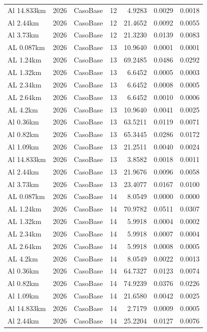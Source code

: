 \documentclass[11pt,a4paper]{article}
\begin{document}
\begin{longtable}{llllrrr}
Al 14.833km & 2026 & CasoBase & 12 & 4.9283 & 0.0029 & 0.0018 \\
Al 2.44km & 2026 & CasoBase & 12 & 21.4652 & 0.0092 & 0.0055 \\
Al 3.73km & 2026 & CasoBase & 12 & 21.3230 & 0.0139 & 0.0083 \\
AL 0.087km & 2026 & CasoBase & 13 & 10.9640 & 0.0001 & 0.0001 \\
AL 1.24km & 2026 & CasoBase & 13 & 69.2485 & 0.0486 & 0.0292 \\
AL 1.32km & 2026 & CasoBase & 13 & 6.6452 & 0.0005 & 0.0003 \\
AL 2.34km & 2026 & CasoBase & 13 & 6.6452 & 0.0008 & 0.0005 \\
AL 2.64km & 2026 & CasoBase & 13 & 6.6452 & 0.0010 & 0.0006 \\
AL 4.2km & 2026 & CasoBase & 13 & 10.9640 & 0.0041 & 0.0025 \\
Al 0.36km & 2026 & CasoBase & 13 & 63.5211 & 0.0119 & 0.0071 \\
Al 0.82km & 2026 & CasoBase & 13 & 65.3445 & 0.0286 & 0.0172 \\
Al 1.09km & 2026 & CasoBase & 13 & 21.2511 & 0.0040 & 0.0024 \\
Al 14.833km & 2026 & CasoBase & 13 & 3.8582 & 0.0018 & 0.0011 \\
Al 2.44km & 2026 & CasoBase & 13 & 21.9676 & 0.0096 & 0.0058 \\
Al 3.73km & 2026 & CasoBase & 13 & 23.4077 & 0.0167 & 0.0100 \\
AL 0.087km & 2026 & CasoBase & 14 & 8.0549 & 0.0000 & 0.0000 \\
AL 1.24km & 2026 & CasoBase & 14 & 70.9782 & 0.0511 & 0.0307 \\
AL 1.32km & 2026 & CasoBase & 14 & 5.9918 & 0.0004 & 0.0002 \\
AL 2.34km & 2026 & CasoBase & 14 & 5.9918 & 0.0007 & 0.0004 \\
AL 2.64km & 2026 & CasoBase & 14 & 5.9918 & 0.0008 & 0.0005 \\
AL 4.2km & 2026 & CasoBase & 14 & 8.0549 & 0.0022 & 0.0013 \\
Al 0.36km & 2026 & CasoBase & 14 & 64.7327 & 0.0123 & 0.0074 \\
Al 0.82km & 2026 & CasoBase & 14 & 74.9239 & 0.0376 & 0.0226 \\
Al 1.09km & 2026 & CasoBase & 14 & 21.6580 & 0.0042 & 0.0025 \\
Al 14.833km & 2026 & CasoBase & 14 & 2.7179 & 0.0009 & 0.0005 \\
Al 2.44km & 2026 & CasoBase & 14 & 25.2204 & 0.0127 & 0.0076 \\

\end{longtable}
\end{document}
